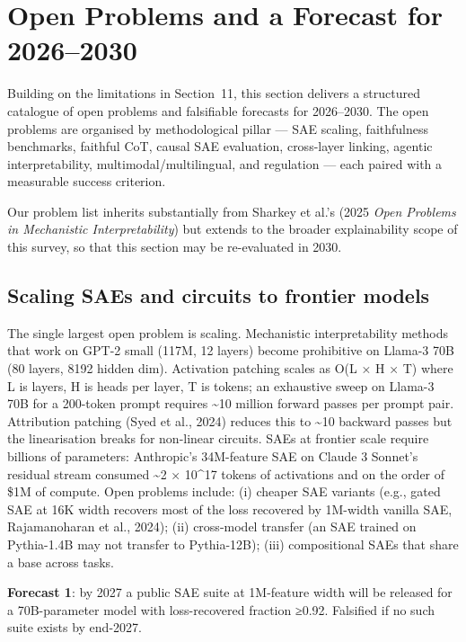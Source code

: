 \section{Open Problems and a Forecast for 2026--2030}\label{open-problems-and-a-forecast-for-20262030}

Building on the limitations in Section~11, this section delivers a structured catalogue of open problems and falsifiable forecasts for 2026--2030. The open problems are organised by methodological pillar --- SAE scaling, faithfulness benchmarks, faithful CoT, causal SAE evaluation, cross-layer linking, agentic interpretability, multimodal/multilingual, and regulation --- each paired with a measurable success criterion.

Our problem list inherits substantially from Sharkey et al.'s (2025 \emph{Open Problems in Mechanistic Interpretability}) but extends to the broader explainability scope of this survey, so that this section may be re-evaluated in 2030.

\subsection{Scaling SAEs and circuits to frontier models}\label{scaling-saes-and-circuits-to-frontier-models}

The single largest open problem is scaling. Mechanistic interpretability methods that work on GPT-2 small (117M, 12 layers) become prohibitive on Llama-3 70B (80 layers, 8192 hidden dim). Activation patching scales as O(L × H × T) where L is layers, H is heads per layer, T is tokens; an exhaustive sweep on Llama-3 70B for a 200-token prompt requires \textasciitilde10 million forward passes per prompt pair. Attribution patching (Syed et al., 2024) reduces this to \textasciitilde10 backward passes but the linearisation breaks for non-linear circuits. SAEs at frontier scale require billions of parameters: Anthropic's 34M-feature SAE on Claude 3 Sonnet's residual stream consumed \textasciitilde2 × 10\^{}17 tokens of activations and on the order of \$1M of compute. Open problems include: (i) cheaper SAE variants (e.g., gated SAE at 16K width recovers most of the loss recovered by 1M-width vanilla SAE, Rajamanoharan et al., 2024); (ii) cross-model transfer (an SAE trained on Pythia-1.4B may not transfer to Pythia-12B); (iii) compositional SAEs that share a base across tasks.

\textbf{Forecast 1}: by 2027 a public SAE suite at 1M-feature width will be released for a 70B-parameter model with loss-recovered fraction ≥0.92. Falsified if no such suite exists by end-2027.

